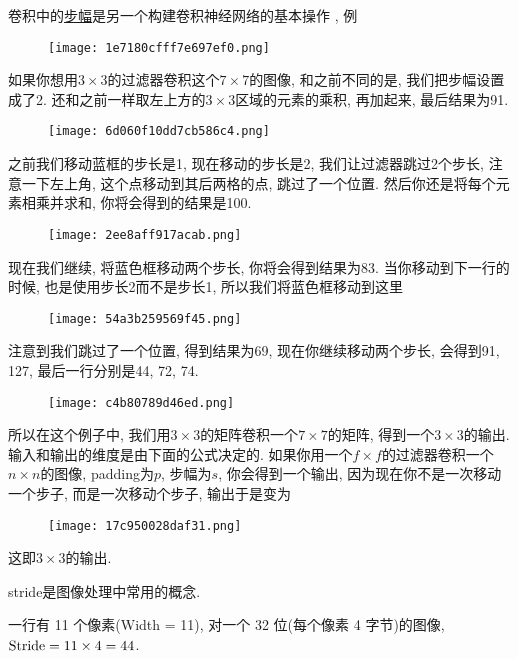 
\begin{example}
卷积中的\href{https://blog.csdn.net/weicao1990/article/details/80282837}{步幅}是另一个构建卷积神经网络的基本操作 , 例
\begin{figure}[H]
    \centering
    \texttt{[image: 1e7180cfff7e697ef0.png]}
\end{figure}
如果你想用$3\times 3$的过滤器卷积这个$7\times 7$的图像, 和之前不同的是, 我们把步幅设置成了2.
还和之前一样取左上方的$3\times 3$区域的元素的乘积, 再加起来, 最后结果为91.
\begin{figure}[H]
    \centering
    \texttt{[image: 6d060f10dd7cb586c4.png]}
\end{figure}
之前我们移动蓝框的步长是1, 现在移动的步长是2, 我们让过滤器跳过2个步长, 注意一下左上角, 这个点移动到其后两格的点, 跳过了一个位置. 
然后你还是将每个元素相乘并求和, 你将会得到的结果是100.
\begin{figure}[H]
    \centering
    \texttt{[image: 2ee8aff917acab.png]}
\end{figure}
现在我们继续, 将蓝色框移动两个步长, 你将会得到结果为83. 
当你移动到下一行的时候, 也是使用步长2而不是步长1, 所以我们将蓝色框移动到这里
\begin{figure}[H]
    \centering
    \texttt{[image: 54a3b259569f45.png]}
\end{figure}
注意到我们跳过了一个位置, 得到结果为69, 现在你继续移动两个步长, 会得到91, 127, 最后一行分别是44, 72, 74.
\begin{figure}[H]
    \centering
    \texttt{[image: c4b80789d46ed.png]}
\end{figure}
所以在这个例子中, 我们用$3\times 3$的矩阵卷积一个$7\times 7$的矩阵, 得到一个$3\times 3$的输出. 
输入和输出的维度是由下面的公式决定的.
如果你用一个$f\times f$的过滤器卷积一个$n\times n$的图像, padding为$p$, 步幅为$s$, 
你会得到一个输出, 因为现在你不是一次移动一个步子, 而是一次移动个步子, 输出于是变为
\begin{figure}[H]
    \centering
    \texttt{[image: 17c950028daf31.png]}
\end{figure}
这即$3\times 3$的输出.
\end{example}
\begin{remark}
stride是图像处理中常用的概念.
\begin{example}
    一行有 11 个像素(Width = 11), 对一个 32 位(每个像素 4 字节)的图像, $\textup{Stride}= 11 \times 4 = 44$.
\end{example}
\end{remark}

